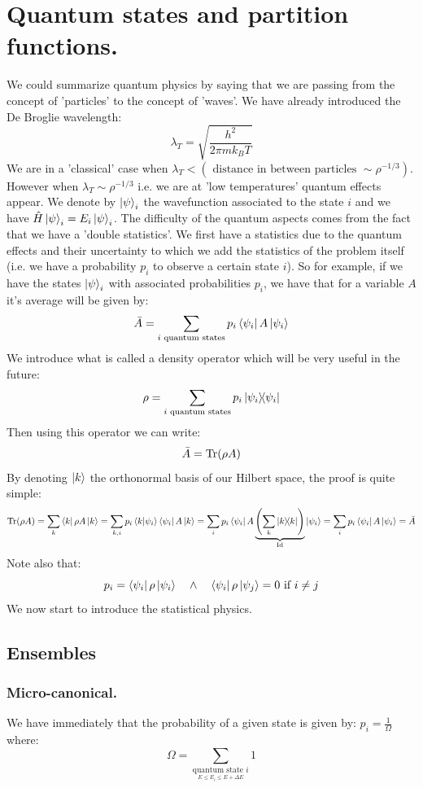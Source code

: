\documentclass[10pt,a4paper]{book}
\begin{document}
\section{Quantum states and partition functions.}
We could summarize quantum physics by saying that we are passing from the concept of 'particles' to the concept of 'waves'. We have already introduced the De Broglie wavelength:
\[
\lambda_T = \sqrt{\frac{h^2}{2 \pi m k_B T}}
\]
We are in a 'classical' case when $\lambda_T < (\text{ distance in between particles } \sim \rho^{-1/3})$. However when $\lambda_T \sim \rho^{-1/3}$ i.e. we are at 'low temperatures' quantum effects appear. We denote by $\ket{\psi}_i$ the wavefunction associated to the state $i$ and we have $\hat{H}\ket{\psi}_i = E_i \ket{\psi}_i$.  The difficulty of the quantum aspects comes from the fact that we have a 'double statistics'. We first have a statistics due to the quantum effects and their uncertainty to which we add the statistics of the problem itself (i.e. we have a probability $p_i$ to observe a certain state $i$). So for example, if we have the states $\ket{\psi}_i$ with associated probabilities $p_i$, we have that for a variable $A$ it's average will be given by:
\[
\bar{A} = \sum_{i \text{ quantum states}} p_i \bra{\psi_i} A \ket{\psi_i}
\]
We introduce what is called a density operator which will be very useful in the future:
\[
\rho = \sum_{i \text{ quantum states}} p_i \op{\psi_i}
\]
Then using this operator we can write:
\[
\bar{A} = \Tr (\rho A)
\]
By denoting $\ket{k}$ the orthonormal basis of our Hilbert space, the  proof is quite simple:
\[
\Tr(\rho A) = \sum_k \bra{k} \rho A \ket{k} = \sum_{k, i} p_i \bra{k}\ket{\psi_i} \bra{\psi_i} A \ket{k} = \sum_i p_i \bra{\psi_i} A \underbrace{\left(\sum_k \op{k}\right)}_{\text{Id}} \ket{\psi_i} = \sum_i p_i \bra{\psi_i} A \ket{\psi_i} = \bar{A}
\]
Note also that:
\[
p_i = \bra{\psi_i} \rho \ket{\psi_i} \quad \land \quad \bra{\psi_i} \rho \ket{\psi_j} = 0 \text{ if } i \neq j
\]
We now start to introduce the statistical physics.
\subsection{Ensembles}
\subsubsection{Micro-canonical.}
We have immediately that the probability of a given state is given by: $p_i = \frac{1}{\Omega}$ where:
\[
\Omega = \sum_{\underset{E\leq E_i\leq E+\Delta E}{\text{quantum state } i}} 1
\]
\end{document}
